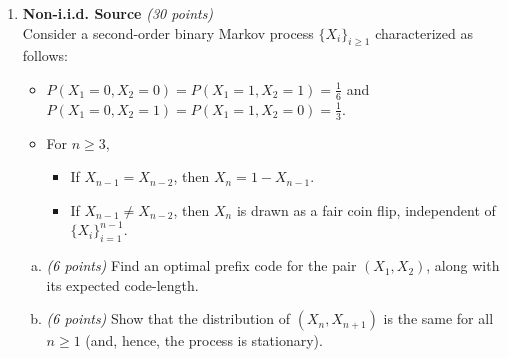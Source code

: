 \documentclass[12pt]{article}
\begin{document}
\begin{enumerate}
\begin{solution}
\begin{enumerate}
\item The expected value of $L_i$ is that of a geometric random variable with parameter
$1/2$: $E[L_i] = 2$. Using the linearity of expectation,
\[
E[\sum_{i=1}^{10} L_i] = \sum_{i=1}^{10} E[L_i] = 20 \mbox{.}
\]

\item Albert is encoding 20 souce bits using an average of 21-bit-long binary codewords. Thus, on average he is expending more than one bit of description per source bit, and not `beating the entropy'. .

\end{enumerate}
\end{solution}

\begin{problem}
    \clearpage
    ~
    \clearpage
\end{problem}

\vskip 0.3in
\item {\bf Non-i.i.d. Source} {\it (30 points)}\\
Consider a second-order binary Markov process   $\{X_i\}_{i \geq 1}$ characterized as follows:
\begin{itemize}
\item $P(X_1=0,X_2=0) = P(X_1=1,X_2=1) = \frac{1}{6}$ and  \\ $P(X_1=0,X_2=1) = P(X_1=1,X_2=0) = \frac{1}{3}$.
\item For $n\geq 3$,
\begin{itemize}
\item If $X_{n-1}=X_{n-2}$, then $X_n = 1- X_{n-1}$.
\item If $X_{n-1}\neq X_{n-2}$, then $X_n$ is drawn as a fair coin flip,  independent of $\{X_i\}_{i=1}^{n-1}$.
\end{itemize}
\end{itemize}

\begin{enumerate}[(a)]

\item {\it (6 points)} Find an optimal prefix code for the pair $(X_1, X_2)$, along with its expected code-length. 

\item {\it (6 points)} Show that the distribution of $(X_{n}, X_{n+1})$ is the same for all $n \geq 1$ (and, hence, the process is stationary). 





\end{enumerate}
\end{enumerate}
\end{document}
